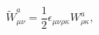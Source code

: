 \begin{equation}
\tilde{W}_{\mu \nu}^{a} = \frac{1}{2} \epsilon_{\mu \nu \rho \kappa} 
W_{\rho \kappa}^{a} ,   
\end{equation}

